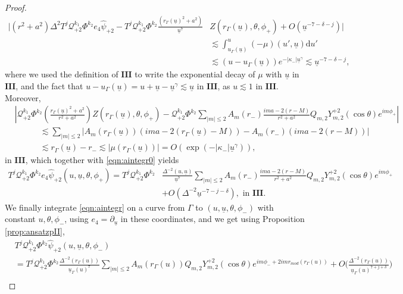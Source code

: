 \documentclass[reqno]{amsart}
\numberwithin{equation}{section}
\newcommand{\mcq}{\mathcal{Q}}
\newcommand{\ubar}{{\underline{u}}}
\newcommand{\carterp}{\mcq_{+2}}
\newcommand{\dee}{\mathrm{d}}
\newcommand{\psihat}{\widehat{\psi}}
\newcommand{\trois}{\mathbf{III}}
\newcommand{\psihatp}{\psihat_{+2}}
\newcommand{\sfrak}{2}
\theoremstyle{plain}
\theoremstyle{definition}
\theoremstyle{remark}
\numberwithin{equation}{section}
\begin{document}
\begin{proof}
\begin{align}
    \Bigg|(r^2+a^2)\Delta^2T^j\carterp^{k_1}\Phi^{k_2}e_4\psihatp\nonumber-T^j\carterp^{k_1}\Phi^{k_2}\frac{(r_\Gamma(\ubar)^2+a^2)}{\ubar^7}&Z(r_\Gamma(\ubar),\theta,\phi_{+})+O(\ubar^{-7-\delta-j})\Bigg|\\
    &\lesssim\int_{u_\Gamma(\ubar)}^u(-\mu)(u',\ubar)\dee u'\nonumber\\
    &\lesssim(u-u_\Gamma(\ubar))e^{-|\kappa_-|\ubar^\gamma}\lesssim\ubar^{-7-\delta-j},\label{eqn:aintegr0}
\end{align}
where we used the definition of $\trois$ to write the exponential decay of $\mu$ with $\ubar$ in $\trois$, and the fact that $u-u_\Gamma(\ubar)=u+\ubar-\ubar^\gamma\lesssim\ubar$ in $\trois$, as $u\lesssim 1$ in $\trois$. Moreover, 
\begin{align}
    &\left|\carterp^{k_1}\Phi^{k_2}\left(\frac{r_\Gamma(\ubar)^2+a^2}{r^2+a^2}\right)Z(r_\Gamma(\ubar),\theta,\phi_{+})-\carterp^{k_1}\Phi^{k_2}\sum_{|m|\leq2}A_m(r_-)\frac{ima-2(r-M)}{r^2+a^2}Q_{m,\sfrak}Y_{m,\sfrak}^{+\sfrak}(\cos\theta)e^{im\phi_{+}}\right|\nonumber\\
    &\quad\quad\quad\lesssim\sum_{|m|\leq2}|A_m(r_\Gamma(\ubar))(ima-2(r_\Gamma(\ubar)-M))-A_m(r_-)(ima-2(r-M))|\nonumber\\
    &\quad\quad\quad\lesssim r_\Gamma(\ubar)-r_-\lesssim|\mu(r_\Gamma(\ubar))|=O(\exp(-|\kappa_-|\ubar^\gamma)),\nonumber
\end{align}
in $\trois$, which together with \eqref{eqn:aintegr0} yields
\begin{align}\label{eqn:aintegr}
    T^j\carterp^{k_1}\Phi^{k_2}e_4\psihatp(u,\ubar,\theta,\phi_{+})=T^j\carterp^{k_1}\Phi^{k_2}&\frac{\Delta^{-2}(u,\ubar)}{\ubar^7}\sum_{|m|\leq2}A_m(r_-)\frac{ima-2(r-M)}{r^2+a^2}Q_{m,\sfrak}Y_{m,\sfrak}^{+\sfrak}(\cos\theta)e^{im\phi_{+}}\nonumber\\
    &+O(\Delta^{-2}\ubar^{-7-j-\delta}),\text{   in   }\trois.
\end{align}
We finally integrate \eqref{eqn:aintegr} on a curve from $\Gamma$ to $(u,\ubar,\theta,\phi_{-})$ with  constant $u,\theta,\phi_{-}$, using $e_4=\partial_\ubar$ in these coordinates, and we get using Proposition \ref{prop:ansatzpII},
\begin{align}
    &T^j\carterp^{k_1}\Phi^{k_2}\psihatp(u,\ubar,\theta,\phi_{-})\nonumber\\
    &=T^j\carterp^{k_1}\Phi^{k_2}\frac{\Delta^{-2}(r_\Gamma(u))}{\ubar_\Gamma(u)^7}\sum_{|m|\leq2}A_m(r_\Gamma(u))Q_{m,\sfrak}Y_{m,\sfrak}^{+\sfrak}(\cos\theta)e^{im\phi_{-}+2imr_{mod}(r_\Gamma(u))}+O\Bigg(\frac{\Delta^{-2}(r_\Gamma(u))}{\ubar_\Gamma(u)^{7+j+\delta}}\Bigg)\nonumber\\

\end{align}
\end{proof}
\end{document}
